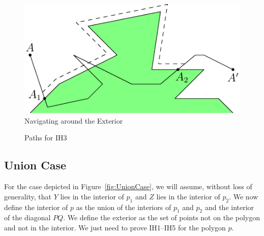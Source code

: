 \begin{figure}
\centering
\includegraphics{jordan/navigation1.pdf}
\caption{Navigating around the Exterior}
\label{fig:Navigation1}
\end{figure}

\begin{figure}
\centering
{}
\caption{Paths for IH3}
\end{figure}

\subsection{Union Case}
For the case depicted in Figure~\ref{fig:UnionCase}, we will assume, without loss of generality, that $Y$ lies in the interior of $p_1$ and $Z$ lies in the interior of $p_2$. We now define the interior of $p$ as the union of the interiors of $p_1$ and $p_2$ and the interior of the diagonal $PQ$. We define the exterior as the set of points not on the polygon and not in the interior. We just need to prove IH1--IH5 for the polygon $p$. 

